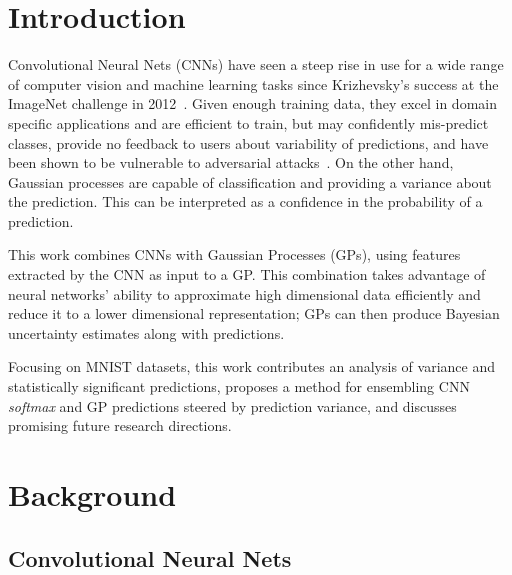 \documentclass{article}
\begin{document}
\section{Introduction}





\label{sec:intro}

 
Convolutional Neural Nets (CNNs) have seen a steep rise in use for a wide range of computer vision and machine learning tasks since Krizhevsky's success at the ImageNet challenge in 2012~\cite{krizhevsky2012imagenet}. Given enough training data, they excel in domain specific applications and are efficient to train, but may confidently mis-predict classes, provide no feedback to users about variability of predictions, and have been shown to be vulnerable to adversarial attacks~\cite{szegedy2013intriguing}. On the other hand, Gaussian processes are capable of classification and providing a variance about the prediction. This can be interpreted as a confidence in the probability of a prediction.

This work combines CNNs with Gaussian Processes (GPs), using features extracted by the CNN as input to a GP. This combination takes advantage of neural networks' ability to approximate high dimensional data efficiently and reduce it to a lower dimensional representation; GPs can then produce Bayesian uncertainty estimates along with predictions.

Focusing on MNIST datasets, this work contributes an analysis of variance and statistically significant predictions, proposes a method for ensembling CNN \textit{softmax} and GP predictions steered by prediction variance, and discusses promising future research directions.


\section{Background}
\label{sec:background}
\subsection{Convolutional Neural Nets}
\label{sec:background:cnn}
\end{document}
